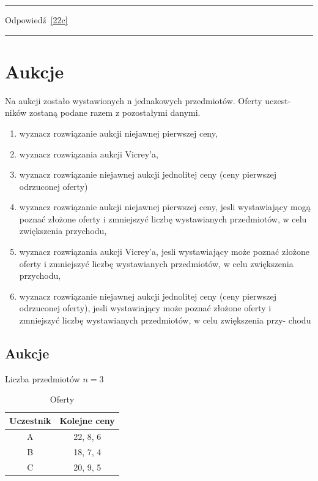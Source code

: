 \documentclass{article}
\begin{document}
\par\noindent\rule{\textwidth}{0.4pt}
Odpowiedź \ref{22c}                  
\par\noindent\rule{\textwidth}{0.4pt}

\section{Aukcje}
Na aukcji zostało wystawionych n jednakowych przedmiotów. Oferty uczest-
ników zostaną podane razem z pozostałymi danymi.

\begin{enumerate}
	\item \label{4a} wyznacz rozwiązanie aukcji niejawnej pierwszej ceny,
	\item \label{4b} wyznacz rozwiązania aukcji Vicrey'a,
	\item \label{4c} wyznacz rozwiązanie niejawnej aukcji jednolitej ceny (ceny pierwszej
		odrzuconej oferty)
	\item \label{4d} wyznacz rozwiązanie aukcji niejawnej pierwszej ceny, jesli wystawiający mogą poznać złożone oferty i zmniejszyć liczbę wystawianych przedmiotów, w celu zwiększenia przychodu,
	\item \label{4e} wyznacz rozwiązania aukcji Vicrey’a, jesli wystawiający może poznać
		złożone oferty i zmniejszyć liczbę wystawianych przedmiotów, w celu
		zwiększenia przychodu,
	\item \label{4f} wyznacz rozwiązanie niejawnej aukcji jednolitej ceny (ceny pierwszej
		odrzuconej oferty), jesli wystawiający może poznać złożone oferty i
		zmniejszyć liczbę wystawianych przedmiotów, w celu zwiększenia przy-
		chodu
\end{enumerate}

\subsection{Aukcje}
Liczba przedmiotów \(n = 3\) \\
\begin{table}[H]
	\centering
	\begin{tabular}{| c | c |}
		\hline
		Uczestnik & Kolejne ceny \\
		\hline
		A         & 22, 8, 6     \\
		B         & 18, 7, 4     \\
		C         & 20, 9, 5     \\
		\hline
	\end{tabular}
	\caption{Oferty}
\end{table}
\end{document}
